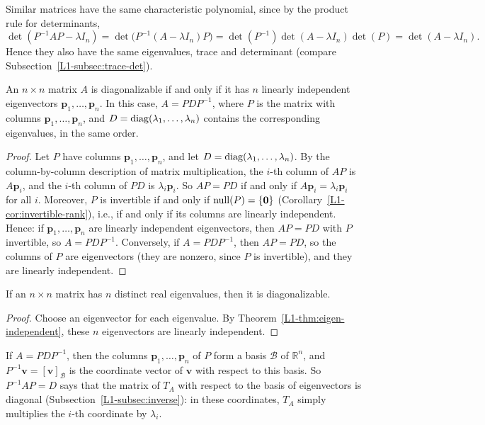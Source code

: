 Similar matrices have the same characteristic polynomial, since by the product rule for determinants,
\[\det(P^{-1}AP - \lambda I_n) = \det\big(P^{-1}(A - \lambda I_n)P\big) = \det(P^{-1})\det(A - \lambda I_n)\det(P) = \det(A - \lambda I_n).\]
Hence they also have the same eigenvalues, trace and determinant (compare Subsection~\ref{L1-subsec:trace-det}).

\begin{theorem}[Diagonalization]\label{L1-thm:diagonalization}
    An $n \times n$ matrix $A$ is diagonalizable if and only if it has $n$ linearly independent eigenvectors $\mathbf{p}_1, \ldots, \mathbf{p}_n$. In this case, $A = PDP^{-1}$, where $P$ is the matrix with columns $\mathbf{p}_1, \ldots, \mathbf{p}_n$, and $D = \operatorname{diag}(\lambda_1, \ldots, \lambda_n)$ contains the corresponding eigenvalues, in the same order.
\end{theorem}

\begin{proof}
    Let $P$ have columns $\mathbf{p}_1, \ldots, \mathbf{p}_n$, and let $D = \operatorname{diag}(\lambda_1, \ldots, \lambda_n)$. By the column-by-column description of matrix multiplication, the $i$-th column of $AP$ is $A\mathbf{p}_i$, and the $i$-th column of $PD$ is $\lambda_i \mathbf{p}_i$. So $AP = PD$ if and only if $A\mathbf{p}_i = \lambda_i \mathbf{p}_i$ for all $i$. Moreover, $P$ is invertible if and only if $\operatorname{null}(P) = \{\mathbf{0}\}$ (Corollary~\ref{L1-cor:invertible-rank}), i.e., if and only if its columns are linearly independent. Hence: if $\mathbf{p}_1, \ldots, \mathbf{p}_n$ are linearly independent eigenvectors, then $AP = PD$ with $P$ invertible, so $A = PDP^{-1}$. Conversely, if $A = PDP^{-1}$, then $AP = PD$, so the columns of $P$ are eigenvectors (they are nonzero, since $P$ is invertible), and they are linearly independent.
\end{proof}

\begin{corollary}\label{L1-cor:distinct-eigenvalues}
    If an $n \times n$ matrix has $n$ distinct real eigenvalues, then it is diagonalizable.
\end{corollary}

\begin{proof}
    Choose an eigenvector for each eigenvalue. By Theorem~\ref{L1-thm:eigen-independent}, these $n$ eigenvectors are linearly independent.
\end{proof}

\begin{remark}
    If $A = PDP^{-1}$, then the columns $\mathbf{p}_1, \ldots, \mathbf{p}_n$ of $P$ form a basis $\mathcal{B}$ of $\mathbb{R}^n$, and $P^{-1}\mathbf{v} = [\mathbf{v}]_{\mathcal{B}}$ is the coordinate vector of $\mathbf{v}$ with respect to this basis. So $P^{-1}AP = D$ says that the matrix of $T_A$ with respect to the basis of eigenvectors is diagonal (Subsection~\ref{L1-subsec:inverse}): in these coordinates, $T_A$ simply multiplies the $i$-th coordinate by $\lambda_i$.
\end{remark}

